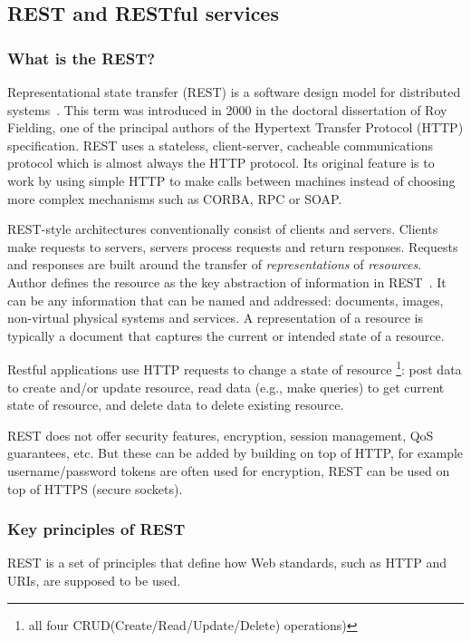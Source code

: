 \subsection{REST and RESTful services}

\subsubsection{What is the REST?}
Representational state transfer (REST) is a software design model for
distributed systems~\cite{Fielding2000}. This term was introduced in 2000 in the doctoral dissertation of
Roy Fielding, one of the principal authors of the Hypertext Transfer Protocol
(\gls{HTTP}) specification. REST uses a stateless, client-server,
cacheable communications protocol which is almost always the HTTP protocol. Its original
feature is to work by using simple HTTP to make calls between machines instead
of choosing more complex mechanisms such as CORBA, RPC or SOAP.

REST-style architectures conventionally consist of clients and servers.
Clients make requests to servers, servers process requests and return responses.
Requests and responses are built around the transfer of \textit{representations}
of \textit{resources}.
Author defines the resource as the key abstraction of information in
REST~\cite{Fielding2000}. It can be any information that can be named and
addressed: documents, images, non-virtual physical systems and services.
A representation of a resource is typically a document that captures the current or intended state of a resource.

Restful applications use HTTP requests to change a state of resource  \footnote{
all four CRUD(Create/Read/Update/Delete) operations)}: post data to create and/or update
resource, read data (e.g., make queries) to get current state of resource, and
delete data to delete existing resource.

REST does not offer security features, encryption, session management, QoS
guarantees, etc. But these can be added by building on top of HTTP, for example
username/password tokens are often used for encryption, REST can be used on
top of HTTPS (secure sockets)\cite{ws_techologies_state_of_the_art}.

\subsubsection{Key principles of REST}
REST is a set of principles that define how Web standards, such as HTTP and
\gls{URI}s, are supposed to be used.

